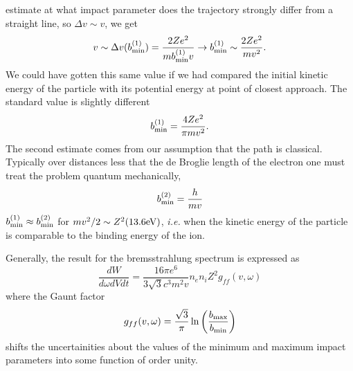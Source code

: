 estimate at what impact parameter does the trajectory strongly differ
from a straight line, so $\Delta v \sim v$, we get
\begin{equation}
v \sim \Delta v(b_{\hbox{\rm \scriptsize min}}^{(1)}) = 
 \frac{2 Z e^2}{m b_{\hbox{\rm \scriptsize min}}^{(1)} v} \rightarrow b_{\hbox{\rm \scriptsize min}}^{(1)}
  \sim \frac{2 Z e^2}{m v^2}.
\label{eq:334}
\end{equation}
We could have gotten this same value if we had compared the initial
kinetic energy of the particle with its potential energy at point of
closest approach.  The standard value is slightly different
\begin{equation}
 b_{\hbox{\rm \scriptsize min}}^{(1)} 
  = \frac{4 Z e^2}{\pi m  v^2}.
\label{eq:335}
\end{equation}
The second estimate comes from our assumption that the path is
classical.   Typically over distances less that the de Broglie length
of the electron one must treat the problem quantum mechanically,
\begin{equation}
 b_{\hbox{\rm \scriptsize min}}^{(2)}  = \frac{h}{m v}
\label{eq:336}
\end{equation}
$b_{\hbox{\rm \scriptsize min}}^{(1)} \approx b_{\hbox{\rm \scriptsize min}}^{(2)}$ for $mv^2/2 \sim
Z^2 (13.6 \hbox{\rm eV})$, {\em i.e.} when the kinetic energy of the
particle is comparable to the binding energy of the ion.

Generally, the result for the bremsstrahlung spectrum is expressed as 
\begin{equation}
\frac{d W}{d\omega dV dt} =
\frac{16 \pi e^6}{3 \sqrt{3} c^3 m^2 v} n_e n_i Z^2 g_{ff}(v,\omega)
\label{eq:337}
\end{equation}
where the Gaunt factor
\begin{equation}
g_{ff} (v,\omega) = \frac{\sqrt{3}}{\pi} \ln \left
(\frac{b_{\hbox{\rm \scriptsize max}}}{b_{\hbox{\rm \scriptsize min}}} \right )
\label{eq:338}
\end{equation}
shifts the uncertainities about the values of the minimum and maximum
impact parameters into some function of order unity.

